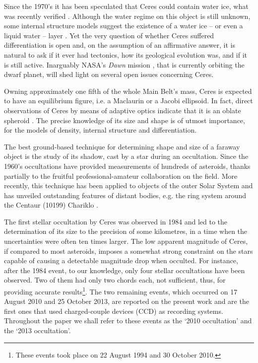 \documentclass[useAMS,usenatbib]{mn2e}
\begin{document}
Since the 1970's it has been speculated that Ceres could contain water ice, what was recently verified \citep{Kuppers2014}. Although the water regime on this object is still unknown, some internal structure models suggest the existence of a water ice -- or even a liquid water -- layer \citep{CastilloR2011}. Yet the very question of whether Ceres suffered differentiation is open and, on the assumption of an affirmative answer, it is natural to ask if it ever had tectonics, how its geological evolution was, and if it is still active. Inarguably NASA's \textit{Dawn} mission \citep{Russell2004}, that is currently orbiting the dwarf planet, will shed light on several open issues concerning Ceres.

Owning approximately one fifth of the whole Main Belt's mass, Ceres is expected to have an equilibrium figure, i.e. a Maclaurin or a Jacobi ellipsoid. In fact, direct observations of Ceres by means of adaptive optics indicate that it is an oblate spheroid \citep{Drummond2014}. The precise knowledge of its size and shape is of utmost importance, for the models of density, internal structure and differentiation.%

The best ground-based technique for determining shape and size of a faraway object is the study of its shadow, cast by a star during an occultation. Since the 1960's occultations have provided measurements of hundreds of asteroids, thanks partially to the fruitful professional-amateur collaboration on the field. More recently, this technique has been applied to objects of the outer Solar System and has unveiled outstanding features of distant bodies, e.g. the ring system around the Centaur (10199) Chariklo \citep{BragaRibas2014}.

The first stellar occultation by Ceres was observed in 1984 \citep{Millis1987} and led to the determination of its size to the precision of some kilometres, in a time when the uncertainties were often ten times larger. The low apparent magnitude of Ceres, if compared to most asteroids, imposes a somewhat strong constraint on the stars capable of causing a detectable magnitude drop when occulted. For instance, after the 1984 event, to our knowledge, only four stellar occultations have been observed. Two of them had only two chords each, not sufficient, thus, for providing accurate results\footnote{These events took place on 22 August 1994 and 30 October 2010.}. The two remaining events, which occurred on 17 August 2010 and 25 October 2013, are reported on the present work and are the first ones that used charged-couple devices (CCD) as recording systems. %
Throughout the paper we shall refer to these events as the `2010 occultation' and the `2013 occultation'.
\end{document}
